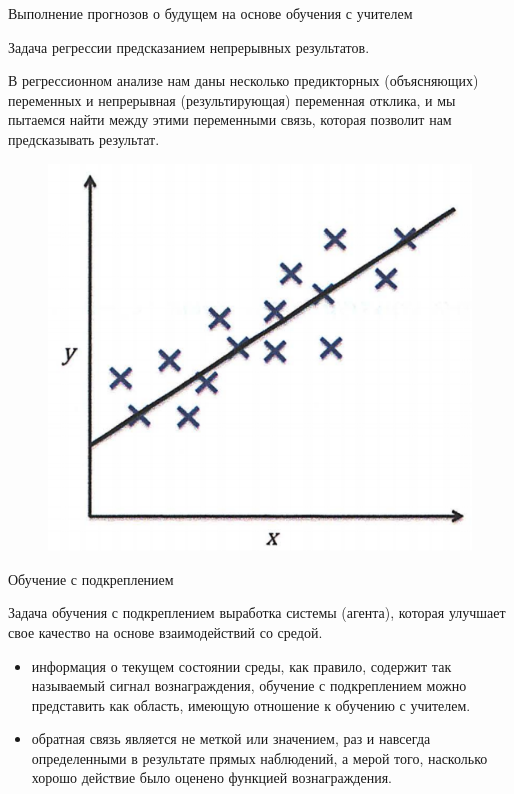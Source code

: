 \documentclass{beamer}
\begin{document}
\begin{frame}[t]{Выполнение прогнозов о будущем на основе обучения с учителем}
\begin{block}{Задача регрессии}
предсказанием непрерывных результатов.
\end{block}
В регрессионном анализе нам даны несколько предикторных (объясняющих) переменных и непрерывная (результирующая) переменная отклика, и мы пытаемся найти между этими переменными связь, которая позволит нам предсказывать результат.
\begin{figure}[h]
\centering
\includegraphics[scale=0.25]{images/lec01-pic06.png}
\end{figure}
\end{frame}

\begin{frame}[t]{Обучение с подкреплением}
\begin{block}{Задача обучения с подкреплением}
выработка системы (агента), которая улучшает свое качество на основе взаимодействий со средой.
\end{block}
\begin{itemize}
\item информация о текущем состоянии среды, как правило, содержит так называемый сигнал вознаграждения, обучение с подкреплением можно представить как область, имеющую отношение к обучению с учителем.
\item обратная связь является не меткой или значением, раз и навсегда определенными в результате прямых наблюдений, а мерой того, насколько хорошо действие было оценено функцией вознаграждения.
\end{itemize}
\end{frame}
\end{document}
